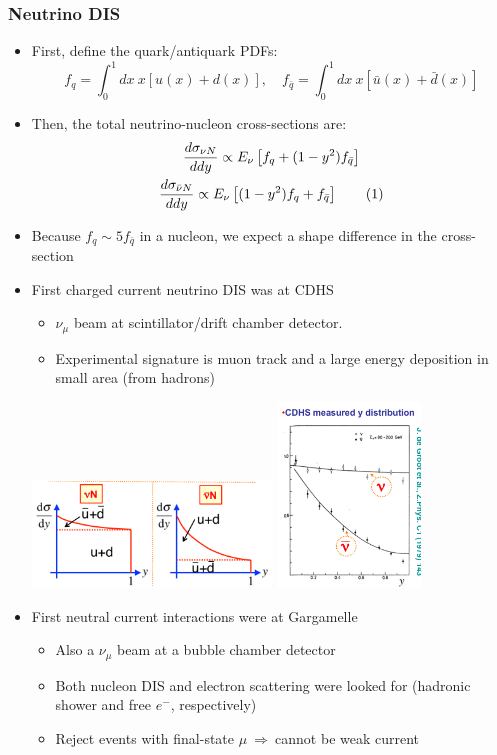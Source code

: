 \documentclass[11pt]{article}
\newcommand\numberthis{\addtocounter{equation}{1}\tag{\theequation}}
\newcommand{\ubar}{\bar{u}}
\newcommand{\nubar}{{\bar{\nu}}}
\newcommand{\qbar}{{\bar{q}}}
\newcommand{\dbar}{\bar{d}}
\newcommand{\dd}[2]{\dfrac{d #1}{d #2}}
\newcommand{\el}{\ensuremath{e^{-}}\xspace}
\newcommand{\thus}{\ensuremath{~\Rightarrow~}}
\begin{document}
\subsubsection{Neutrino DIS}
\begin{itemize}
  \item First, define the quark/antiquark PDFs:
  \begin{equation}
    f_q = \int_0^1 dx ~ x[u(x)+d(x)], \quad f_\qbar = \int_0^1 dx ~ x[\ubar(x)+\dbar(x)]
  \end{equation}
  \item Then, the total neutrino-nucleon cross-sections are:
  \begin{gather*}
    \dd{\sigma_{\nu N}}{dy} \propto E_\nu \left[ f_q + (1-y^2) f_\qbar\right]\\
    \dd{\sigma_{\nubar N}}{dy} \propto E_\nu \left[(1-y^2)  f_q + f_\qbar\right]\numberthis
  \end{gather*}
  \item Because $f_q \sim 5 f_\qbar$ in a nucleon, we expect a shape difference in the cross-section
  \item First charged current neutrino DIS was at CDHS
  \begin{itemize}
    \item $\nu_\mu$ beam at scintillator/drift chamber detector. 
    \item Experimental signature is muon track and a large energy deposition in small area (from hadrons)
  \end{itemize}
  \begin{center}
    \includegraphics[width=0.5\textwidth,valign=c]{figs/nudis.png}
    \includegraphics[width=0.3\textwidth,valign=c]{figs/cdhs.png}
  \end{center}
  \item First neutral current interactions were at Gargamelle
  \begin{itemize}
    \item Also a $\nu_\mu$ beam at a bubble chamber detector
    \item Both nucleon DIS and electron scattering were looked for (hadronic shower and free $\el$, respectively)
    \item Reject events with final-state $\mu$\thus cannot be weak current
  \end{itemize}
\end{itemize}
\end{document}
